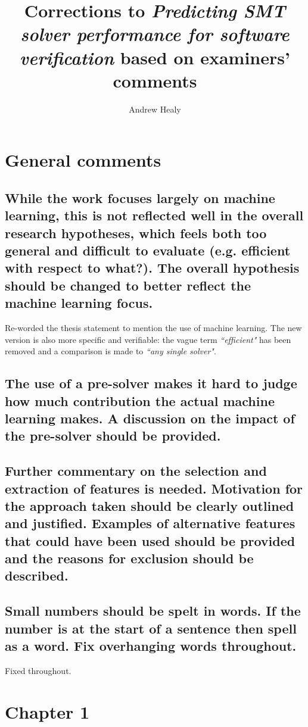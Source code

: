 \documentclass[]{article}
\title{Corrections to \emph{Predicting SMT solver performance for software verification} based on examiners' comments}
\author{Andrew Healy}
\begin{document}
\maketitle

\section{General comments}

\subsection{While the work focuses largely on machine learning, this is not reflected well in the overall research hypotheses, which feels both too general and difficult to evaluate (e.g. efficient with respect to what?). The overall hypothesis should be changed to better reflect the machine learning focus.}

\label{thesis-statement}

Re-worded the thesis statement to mention the use of machine learning. 
The new version is also more specific and verifiable: the vague term \emph{``efficient"} has been removed and a comparison is made to \emph{``any single solver"}.
 
\subsection{The use of a pre-solver makes it hard to judge how much contribution the actual machine learning makes. A discussion on the impact of the pre-solver should be provided.}
	
\subsection{Further commentary on the selection and extraction of features is needed. Motivation for the approach taken should be clearly outlined and justified. Examples of alternative features that could have been used should be provided and the reasons for exclusion should be described.}
\label{features}

\subsection{Small numbers should be spelt in words. If the number is at the start of a sentence then spell as a word. Fix overhanging words throughout.}
\label{overhang-numbers}
Fixed throughout.

\section{Chapter 1}
\end{document}
